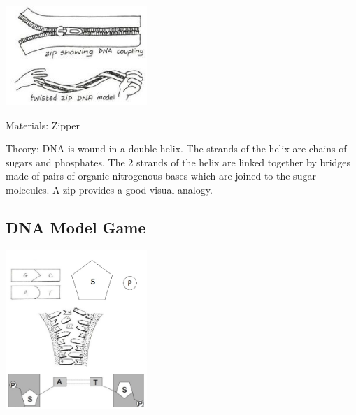 \begin{multicols}{2}
\begin{center}
\includegraphics[width=0.4\textwidth]{./img/vso/dna-zipper.jpg}
\end{center}

\begin{description*}
\item[Materials:]{Zipper}
\item[Theory:]{DNA is wound in a double helix.
The strands of the helix are chains
of sugars and phosphates. The 2
strands of the helix are linked
together by bridges made of pairs
of organic nitrogenous bases
which are joined to the sugar
molecules. A zip provides a good
visual analogy.}
\end{description*}

\subsection{DNA Model Game} %

\begin{center}
\includegraphics[width=0.4\textwidth]{./img/dna-game.jpg}
\end{center}


\end{multicols}
